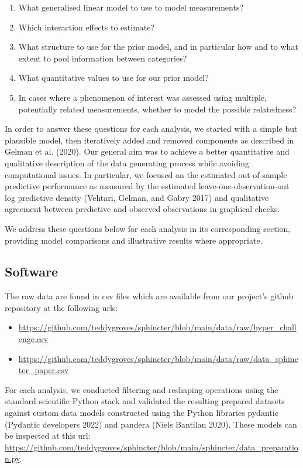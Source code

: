 \documentclass[
  letterpaper,
  DIV=11,
  numbers=noendperiod,
  oneside]{scrartcl}
\providecommand{\tightlist}{%
  \setlength{\itemsep}{0pt}\setlength{\parskip}{0pt}}\usepackage{longtable,booktabs,array}
\theoremstyle{plain}
\theoremstyle{remark}
\begin{document}
\begin{enumerate}
\def\labelenumi{\arabic{enumi}.}
\item
  What generalised linear model to use to model measurements?
\item
  Which interaction effects to estimate?
\item
  What structure to use for the prior model, and in particular how and
  to what extent to pool information between categories?
\item
  What quantitative values to use for our prior model?
\item
  In cases where a phenomenon of interest was assessed using multiple,
  potentially related measurements, whether to model the possible
  relatedness?
\end{enumerate}

In order to answer these questions for each analysis, we started with a
simple but plausible model, then iteratively added and removed
components as described in Gelman et al. (2020). Our general aim was to
achieve a better quantitative and qualitative description of the data
generating process while avoiding computational issues. In particular,
we focused on the estimated out of sample predictive performance as
measured by the estimated leave-one-observation-out log predictive
density (Vehtari, Gelman, and Gabry 2017) and qualitative agreement
between predictive and observed observations in graphical checks.

We address these questions below for each analysis in its corresponding
section, providing model comparisons and illustrative results where
appropriate.

\subsection{Software}\label{software}

The raw data are found in csv files which are available from our
project's github repository at the following urls:

\begin{itemize}
\tightlist
\item
  \url{https://github.com/teddygroves/sphincter/blob/main/data/raw/hyper_challenge.csv}
\item
  \url{https://github.com/teddygroves/sphincter/blob/main/data/raw/data_sphincter_paper.csv}
\end{itemize}

For each analysis, we conducted filtering and reshaping operations using
the standard scientific Python stack and validated the resulting
prepared datasets against custom data models constructed using the
Python libraries pydantic (Pydantic developers 2022) and pandera (Niels
Bantilan 2020). These models can be inspected at this url:
\url{https://github.com/teddygroves/sphincter/blob/main/sphincter/data_preparation.py}.
\end{document}
